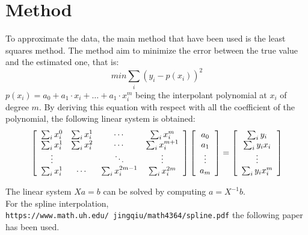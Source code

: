 \documentclass[12pt]{article}
\begin{document}
 \section{Method}
 To approximate the data, the main method that have been used is the least squares method. The method aim to minimize the error between the true value and the estimated one, that is:
 \begin{equation}
 min \sum_i (y_i - p(x_i))^2
 \end{equation}
 $p(x_i) = a_0 + a_1\cdot x_i+ \ldots +a_1\cdot x_i^m$ being the interpolant polynomial at $x_i$ of degree $m$.
 By deriving this equation with respect with all the coefficient of the polynomial, the following linear system is obtained:
 \begin{equation}
\left[ \begin{array}{cccc}
\sum_i x_i^0 & \sum_i x_i^1 & \cdots & \sum_i x_i^m \\
\sum_i x_i^1 & \sum_i x_i^2 & \cdots & \sum_i x_i^{m+1} \\
\vdots & \hfill & \ddots & \vdots \\
\sum_i x_i^1& \cdots & \sum_i x_i^{2m-1} & \sum_i x_i^{2m}\\
\end{array} \right]
\left[ \begin{array}{c}
a_0 \\
a_1\\
\vdots\\
a_m\\
\end{array} \right] = 
\left[ \begin{array}{c}
\sum_i y_i  \\
\sum_i y_i x_i\\
\vdots\\
\sum_i y_i x_i^m\\
\end{array} \right]
\end{equation}
 
 The linear system $Xa=b$ can be solved by computing $a = X^{-1}b$.\\
 For the spline interpolation, \texttt{https://www.math.uh.edu/~jingqiu/math4364/spline.pdf} the following paper has been used.
 
\end{document}
